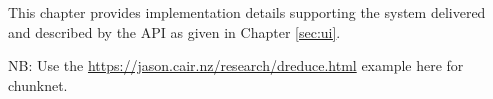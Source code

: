 This chapter provides implementation details supporting the system delivered and described by the API as given in Chapter \ref{sec:ui}.

NB: Use the \url{https://jason.cair.nz/research/dreduce.html} example here for chunknet.
